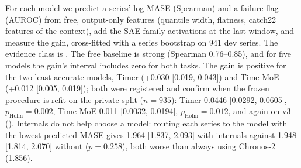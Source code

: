 For each model we predict a series' log MASE (Spearman) and a failure flag (AUROC) from free, output-only features
(quantile width, flatness, catch22 features of the context), add the SAE-family activations at the last window, and
measure the gain, cross-fitted with a series bootstrap on 941 dev series. The evidence class is . The free
baseline is strong (Spearman 0.76--0.85), and for five models the gain's interval includes zero for both tasks. The gain is
positive for the two least accurate models, Timer (+0.030 [0.019, 0.043]) and Time-MoE (+0.012 [0.005, 0.019]); both
were registered and confirm when the frozen procedure is refit on the private split ($n=935$): Timer 0.0446 [0.0292,
0.0605], $p_{\text{Holm}}=0.002$, Time-MoE 0.011 [0.0032, 0.0194], $p_{\text{Holm}}=0.012$, and again on v3 ().
Internals do not help choose a model: routing each series to the model with the lowest predicted MASE gives 1.964
[1.837, 2.093] with internals against 1.948 [1.814, 2.070] without ($p=0.258$), both worse than always using Chronos-2
(1.856).

